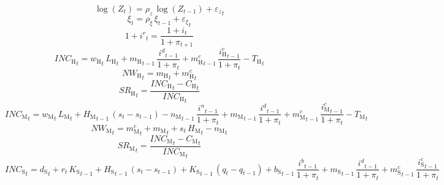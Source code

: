 \begin{dmath}
\log\left({Z}_{t}\right)={\rho_z}\, \log\left({Z}_{t-1}\right)+{\varepsilon_z}_{t}
\end{dmath}
\begin{dmath}
{\xi}_{t}={\rho_\xi}\, {\xi}_{t-1}+{\varepsilon_\xi}_{t}
\end{dmath}
\begin{dmath}
1+{i^r}_{t}=\frac{1+{i}_{t}}{1+{\pi}_{t+1}}
\end{dmath}
\begin{dmath}
{INC_\mathrm{H}}_{t}={w_\mathrm{H}}_{t}\, {L_\mathrm{H}}_{t}+{m_\mathrm{H}}_{t-1}\, \frac{{i^d}_{t-1}}{1+{\pi}_{t}}+{m^c_\mathrm{H}}_{t-1}\, \frac{{i^c_\mathrm{H}}_{t-1}}{1+{\pi}_{t}}-{T_\mathrm{H}}_{t}
\end{dmath}
\begin{dmath}
{NW_\mathrm{H}}_{t}={m_\mathrm{H}}_{t}+{m^c_\mathrm{H}}_{t}
\end{dmath}
\begin{dmath}
{SR_\mathrm{H}}_{t}=\frac{{INC_\mathrm{H}}_{t}-{C_\mathrm{H}}_{t}}{{INC_\mathrm{H}}_{t}}
\end{dmath}
\begin{dmath}
{INC_\mathrm{M}}_{t}={w_\mathrm{M}}_{t}\, {L_\mathrm{M}}_{t}+{H_\mathrm{M}}_{t-1}\, \left({s}_{t}-{s}_{t-1}\right)-{n_\mathrm{M}}_{t-1}\, \frac{{i^n}_{t-1}}{1+{\pi}_{t}}+{m_\mathrm{M}}_{t-1}\, \frac{{i^d}_{t-1}}{1+{\pi}_{t}}+{m^c_\mathrm{M}}_{t-1}\, \frac{{i^c_\mathrm{M}}_{t-1}}{1+{\pi}_{t}}-{T_\mathrm{M}}_{t}
\end{dmath}
\begin{dmath}
{NW_\mathrm{M}}_{t}={m^c_\mathrm{M}}_{t}+{m_\mathrm{M}}_{t}+{s}_{t}\, {H_\mathrm{M}}_{t}-{n_\mathrm{M}}_{t}
\end{dmath}
\begin{dmath}
{SR_\mathrm{M}}_{t}=\frac{{INC_\mathrm{M}}_{t}-{C_\mathrm{M}}_{t}}{{INC_\mathrm{M}}_{t}}
\end{dmath}
\begin{dmath}
{INC_\mathrm{S}}_{t}={d_\mathrm{S}}_{t}+{r}_{t}\, {K_\mathrm{S}}_{t-1}+{H_\mathrm{S}}_{t-1}\, \left({s}_{t}-{s}_{t-1}\right)+{K_\mathrm{S}}_{t-1}\, \left({q}_{t}-{q}_{t-1}\right)+{b_\mathrm{S}}_{t-1}\, \frac{{i^b}_{t-1}}{1+{\pi}_{t}}+{m_\mathrm{S}}_{t-1}\, \frac{{i^d}_{t-1}}{1+{\pi}_{t}}+{m^c_\mathrm{S}}_{t-1}\, \frac{{i^c_\mathrm{S}}_{t-1}}{1+{\pi}_{t}}
\end{dmath}
